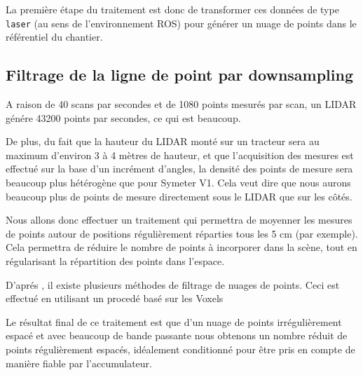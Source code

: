 \documentclass[12pt,a4paper]{report}
\begin{document}
		\para La première étape du traitement est donc de transformer ces données de type \verb|laser| (au sens de l'environnement ROS) pour générer un nuage de points dans le référentiel du chantier.
	
	
		\subsection{Filtrage de la ligne de point par downsampling}
	
		\para A raison de 40 scans par secondes et de 1080 points mesurés par scan, un LIDAR génére 43200 points par secondes, ce qui est beaucoup.
	
		\para De plus, du fait que la hauteur du LIDAR monté sur un tracteur sera au maximum d'environ 3 à 4 mètres de hauteur, et que l'acquisition des mesures est effectué sur la base d'un incrément d'angles, la densité des points de mesure sera beaucoup plus hétérogène que pour Symeter V1. Cela veut dire que nous aurons beaucoup plus de points de mesure directement sous le LIDAR que sur les côtés.
	
		\para Nous allons donc effectuer un traitement qui permettra de moyenner les mesures de points autour de positions régulièrement réparties tous les 5 cm (par exemple). Cela permettra de réduire le nombre de points à incorporer dans la scène,  tout en régularisant la répartition des points dans l'espace.
		
		\para D'aprés \cite{moreno_comparative_2016}, il existe plusieurs méthodes de filtrage de nuages de points. Ceci est effectué en utilisant un procedé basé sur les Voxels
	

		\para Le résultat final de ce traitement est que d'un nuage de points irrégulièrement espacé et avec beaucoup de bande passante nous obtenons un nombre réduit de points régulièrement espacés, idéalement conditionné pour être pris en compte de manière fiable par l'accumulateur.
	

		
\end{document}
